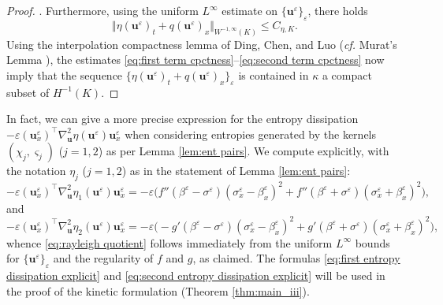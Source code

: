 \documentclass[11pt,a4paper,reqno]{amsart}
\numberwithin{equation}{section}
\theoremstyle{definition}
\theoremstyle{remark}
\newcommand{\bu}{\mathbf{u}}
\renewcommand{\leq}{\leqslant}
\begin{document}
{\begin{proof}
 \smallskip 
 
 . Furthermore, using the uniform $L^\infty$ estimate on $\{\bu^\varepsilon\}_\varepsilon$, there holds 
    \begin{equation*}
      \Vert  \eta(\bu^\varepsilon)_t + q(\bu^\varepsilon)_x \Vert_{W^{-1,\infty}(K)} \leq C_{\eta,K}. 
    \end{equation*}
    Using the interpolation compactness lemma of Ding, Chen, and Luo \cite[Chapter 4]{dingchenluo1} (\textit{cf.} Murat's Lemma \cite{muratcone}), the estimates \eqref{eq:first term cpctness}--\eqref{eq:second term cpctness} now imply that the sequence $\{ \eta(\bu^\varepsilon)_t + q(\bu^\varepsilon)_x \}_\varepsilon$ is contained in $\kappa$ a compact subset of $H^{-1}(K)$. 
\end{proof}

In fact, we can give a more precise expression for the entropy dissipation $-\varepsilon(\bu^\varepsilon_x)^\intercal \nabla^2_\bu \eta(\bu^\varepsilon) \bu_x^\varepsilon$ when considering entropies generated by the kernels $(\chi_j,\varsigma_j)$ ($j=1,2$) as per Lemma \ref{lem:ent pairs}. We compute explicitly, with the notation $\eta_j$ ($j=1,2$) as in the statement of Lemma \ref{lem:ent pairs}: 
\begin{equation}\label{eq:first entropy dissipation explicit}
    -\varepsilon(\bu^\varepsilon_x)^\intercal \nabla^2_\bu \eta_1(\bu^\varepsilon) \bu_x^\varepsilon = -\varepsilon\Big( f''(\beta^\varepsilon-\sigma^\varepsilon) (\sigma^\varepsilon_x - \beta^\varepsilon_x)^2 + f''(\beta^\varepsilon + \sigma^\varepsilon) (\sigma^\varepsilon_x + \beta^\varepsilon_x)^2  \Big), 
\end{equation}
and 
\begin{equation}\label{eq:second entropy dissipation explicit}
    -\varepsilon(\bu^\varepsilon_x)^\intercal \nabla^2_\bu \eta_2(\bu^\varepsilon) \bu_x^\varepsilon = -\varepsilon\Big( -g'(\beta^\varepsilon-\sigma^\varepsilon)(\sigma^\varepsilon_x - \beta^\varepsilon_x)^2 + g'(\beta^\varepsilon+\sigma^\varepsilon)(\sigma^\varepsilon_x + \beta^\varepsilon_x)^2  \Big), 
\end{equation}
whence \eqref{eq:rayleigh quotient} follows immediately from the uniform $L^\infty$ bounds for $\{\bu^\varepsilon\}_\varepsilon$ and the regularity of $f$ and $g$, as claimed. The formulas \eqref{eq:first entropy dissipation explicit} and \eqref{eq:second entropy dissipation explicit} will be used in the proof of the kinetic formulation (Theorem \ref{thm:main_iii}). 





}
\end{document}
